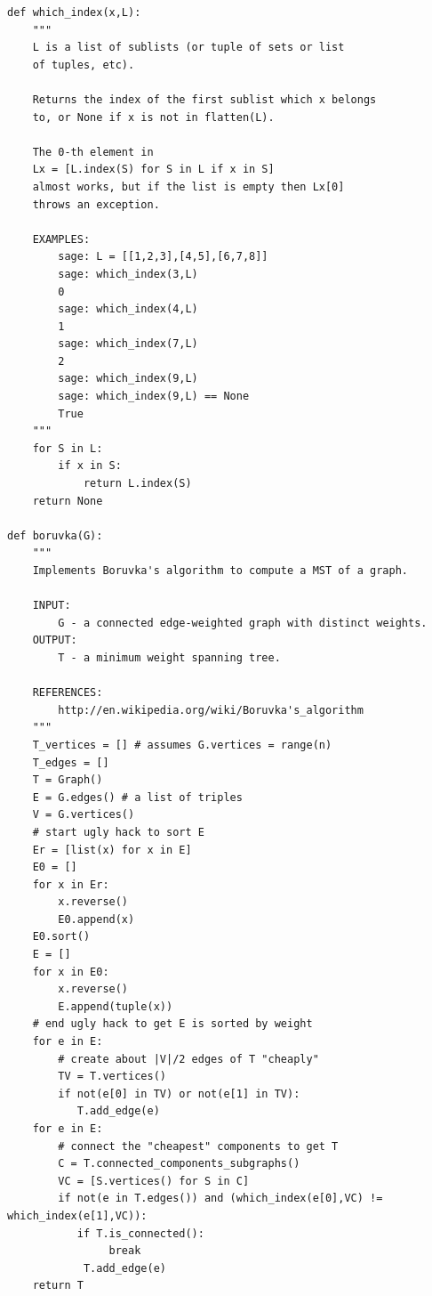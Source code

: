 \begin{lstlisting}
def which_index(x,L):
    """
    L is a list of sublists (or tuple of sets or list
    of tuples, etc).

    Returns the index of the first sublist which x belongs
    to, or None if x is not in flatten(L).

    The 0-th element in
    Lx = [L.index(S) for S in L if x in S]
    almost works, but if the list is empty then Lx[0]
    throws an exception.

    EXAMPLES:
        sage: L = [[1,2,3],[4,5],[6,7,8]]
        sage: which_index(3,L)
        0
        sage: which_index(4,L)
        1
        sage: which_index(7,L)
        2
        sage: which_index(9,L)
        sage: which_index(9,L) == None
        True
    """
    for S in L:
        if x in S:
            return L.index(S)
    return None

def boruvka(G):
    """
    Implements Boruvka's algorithm to compute a MST of a graph.

    INPUT:
        G - a connected edge-weighted graph with distinct weights.
    OUTPUT:
        T - a minimum weight spanning tree.

    REFERENCES:
        http://en.wikipedia.org/wiki/Boruvka's_algorithm
    """
    T_vertices = [] # assumes G.vertices = range(n)
    T_edges = []
    T = Graph()
    E = G.edges() # a list of triples
    V = G.vertices()
    # start ugly hack to sort E
    Er = [list(x) for x in E]
    E0 = []
    for x in Er:
        x.reverse()
        E0.append(x)
    E0.sort()
    E = []
    for x in E0:
        x.reverse()
        E.append(tuple(x))
    # end ugly hack to get E is sorted by weight
    for e in E:
        # create about |V|/2 edges of T "cheaply"
        TV = T.vertices()
        if not(e[0] in TV) or not(e[1] in TV):
           T.add_edge(e)
    for e in E:
        # connect the "cheapest" components to get T
        C = T.connected_components_subgraphs()
        VC = [S.vertices() for S in C]
        if not(e in T.edges()) and (which_index(e[0],VC) != which_index(e[1],VC)):
           if T.is_connected():
                break
            T.add_edge(e)
    return T
\end{lstlisting}

